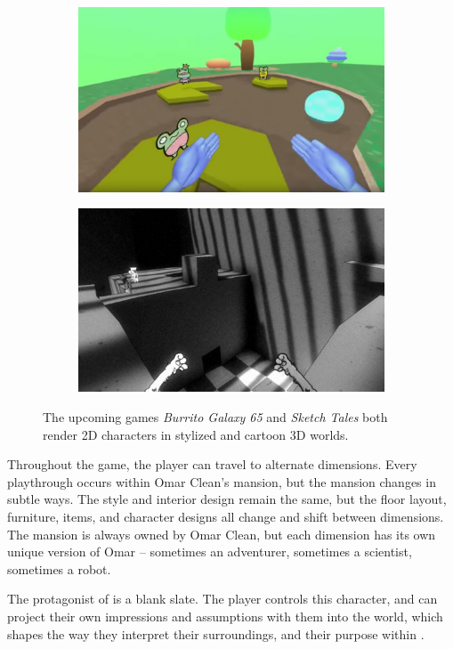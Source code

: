 \begin{figure}[htb]
  \centering%
  \begin{subfigure}{.33\textwidth}
    \centering
    \includegraphics[width=.9\linewidth]{images/burrito}
  \end{subfigure}%
  \begin{subfigure}{.33\textwidth}
    \centering
    \includegraphics[width=.9\linewidth]{images/sketchtales}
  \end{subfigure}%
  \caption{The upcoming games \textit{Burrito Galaxy 65} and \textit{Sketch Tales} both render 2D characters in stylized and cartoon 3D worlds.}
  \label{fig:render_style}
\end{figure}

Throughout the game, the player can travel to alternate dimensions. Every playthrough occurs within Omar Clean's mansion, but the mansion changes in subtle ways. The style and interior design remain the same, but the floor layout, furniture, items, and character designs all change and shift between dimensions. The mansion is always owned by Omar Clean, but each dimension has its own unique version of Omar -- sometimes an adventurer, sometimes a scientist, sometimes a robot. 

The protagonist of \ourgame{} is a blank slate. The player controls this character, and can project their own impressions and assumptions with them into the world, which shapes the way they interpret their surroundings, and their purpose within \ourgame{}.